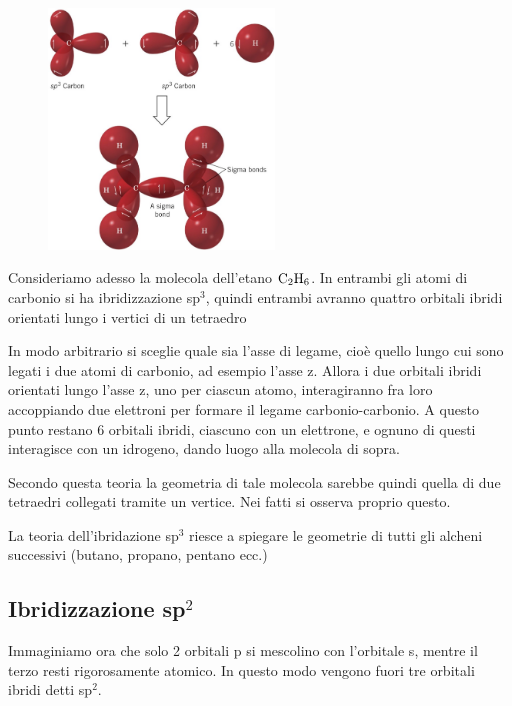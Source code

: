 \hspace{0.5cm}\begin{minipage}{0.2\textwidth}
    \begin{figure}[H]
        \includegraphics[width=6cm]{immagini/etano.png}
    \end{figure}
\end{minipage} \hfill
\begin{minipage}{0.5\textwidth}
    \vspace{1cm}Consideriamo adesso la molecola dell'etano $\rm C_2H_6$. In entrambi gli atomi di carbonio si ha ibridizzazione sp$^3$, quindi entrambi avranno quattro orbitali ibridi orientati lungo i vertici di un tetraedro

    In modo arbitrario si sceglie quale sia l'asse di legame, cioè quello lungo cui sono legati i due atomi di carbonio, ad esempio l'asse z. Allora i due orbitali ibridi orientati lungo l'asse z, uno per ciascun atomo, interagiranno fra loro accoppiando due elettroni per formare il legame carbonio-carbonio. A questo punto restano 6 orbitali ibridi, ciascuno con un elettrone, e ognuno di questi interagisce con un idrogeno, dando luogo alla molecola di sopra.
    
    Secondo questa teoria la geometria di tale molecola sarebbe quindi quella di due tetraedri collegati tramite un vertice. Nei fatti si osserva proprio questo.
\end{minipage}

\vspace{0.2cm}La teoria dell'ibridazione sp$^3$ riesce a spiegare le geometrie di tutti gli alcheni successivi (butano, propano, pentano ecc.)

\subsection{Ibridizzazione sp$^2$}
Immaginiamo ora che solo 2 orbitali p si mescolino con l'orbitale s, mentre il terzo resti rigorosamente atomico. In questo modo vengono fuori tre orbitali ibridi detti sp$^2$.

